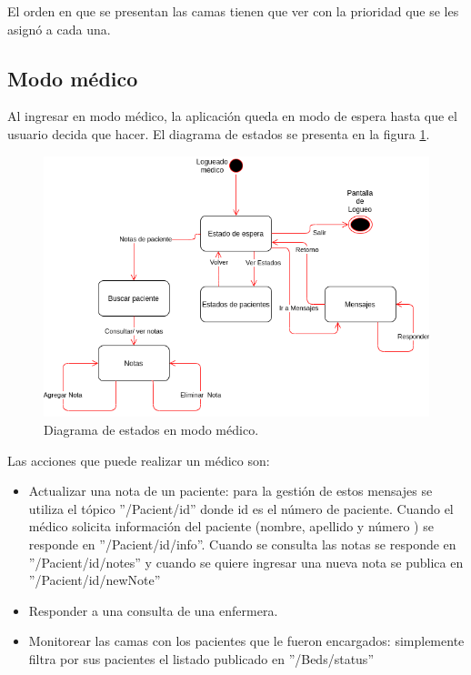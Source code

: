 El orden en que se presentan las camas tienen que ver con la prioridad que se les asignó a cada una.



\pagebreak
\subsection{Modo médico}
Al ingresar en modo médico, la aplicación queda en modo de espera hasta que el usuario decida que hacer. El diagrama de estados se presenta en la figura \ref{fig: Diagrama de estados en modo médico.}. 

\begin{figure}[ht]
	\centering
	\includegraphics[scale=.65]{./Figures/app/modo-medico.png}
	\caption{ Diagrama de estados en modo médico.}
	\label{fig: Diagrama de estados en modo médico.}
\end{figure} 

Las acciones que puede realizar un médico son:
\begin{itemize}
\item Actualizar una nota de un paciente: para la gestión de estos mensajes se utiliza el tópico ''/Pacient/id'' donde id es el número de paciente. Cuando el médico solicita información del paciente (nombre, apellido y número ) se responde  en ''/Pacient/id/info''. Cuando se consulta las notas se responde en ''/Pacient/id/notes'' y cuando se quiere ingresar una nueva nota se publica en ''/Pacient/id/newNote''
\item Responder a una consulta de una enfermera.
\item Monitorear las camas con los pacientes que le fueron encargados: simplemente filtra por sus pacientes el listado publicado en ''/Beds/status''

\end{itemize}



